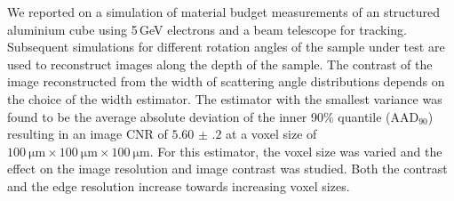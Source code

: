 \documentclass{PoS}
\newcommand{\aadninety}{\ensuremath{\textrm{AAD}_\textrm{90}}}
\begin{document}
We reported on a simulation of material budget measurements of an structured aluminium cube using 5\,GeV electrons and a beam telescope for tracking. 
Subsequent simulations for different rotation angles of the sample under test are used to reconstruct images along the depth of the sample. 
The contrast of the image reconstructed from the width of scattering angle distributions depends on the choice of the width estimator.
The estimator with the smallest variance was found to be the average absolute deviation of the inner 90\% quantile ($\aadninety$)
 resulting in an image CNR of $\num{5.60(20)}$ at a voxel size of $\SI{100}{\um} \times \SI{100}{\um} \times \SI{100}{\um}$.
For this estimator, the voxel size was varied and the effect on the image resolution and image contrast was studied.
Both the contrast and the edge resolution increase towards increasing voxel sizes. 






\end{document}
